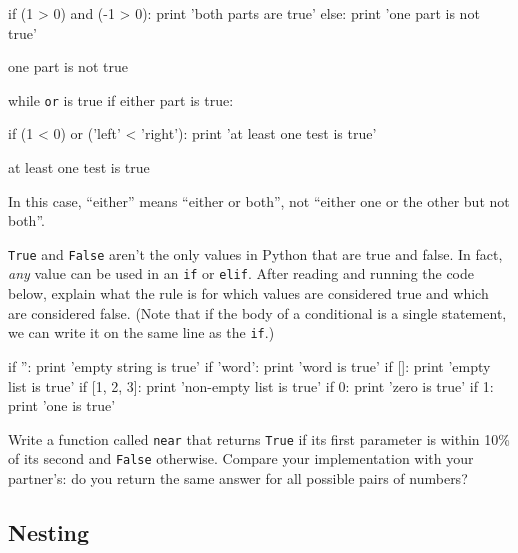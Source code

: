 \begin{VerbIn}
if (1 > 0) and (-1 > 0):
    print 'both parts are true'
else:
    print 'one part is not true'
\end{VerbIn}

\begin{VerbOut}
one part is not true
\end{VerbOut}

while \texttt{or} is true if either part is true:

\begin{VerbIn}
if (1 < 0) or ('left' < 'right'):
    print 'at least one test is true'
\end{VerbIn}

\begin{VerbOut}
at least one test is true
\end{VerbOut}

In this case, ``either'' means ``either or both'', not ``either one or
the other but not both''.

\begin{challenge}
  \texttt{True} and \texttt{False} aren't the only values in Python that
  are true and false. In fact, \emph{any} value can be used in an
  \texttt{if} or \texttt{elif}. After reading and running the code
  below, explain what the rule is for which values are considered true
  and which are considered false. (Note that if the body of a
  conditional is a single statement, we can write it on the same line as
  the \texttt{if}.)

\begin{VerbIn}
if '': print 'empty string is true'
if 'word': print 'word is true'
if []: print 'empty list is true'
if [1, 2, 3]: print 'non-empty list is true'
if 0: print 'zero is true'
if 1: print 'one is true'
\end{VerbIn}
\end{challenge}

\begin{challenge}
  Write a function called \texttt{near} that returns \texttt{True} if
  its first parameter is within 10\% of its second and \texttt{False}
  otherwise. Compare your implementation with your partner's: do you
  return the same answer for all possible pairs of numbers?
\end{challenge}

\subsection{Nesting}

